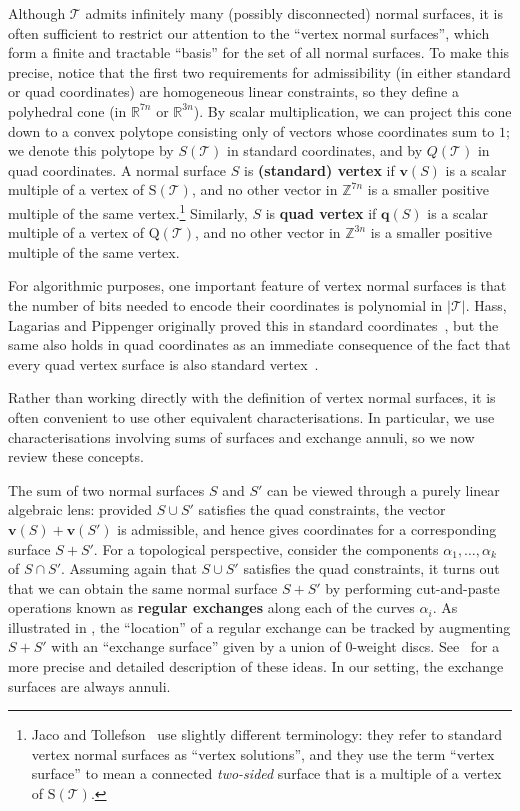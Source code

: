 \documentclass[10pt,a4paper]{amsart}
\newcommand{\tri}{\mathcal{T}}
\begin{document}
Although $\tri$ admits infinitely many (possibly disconnected) normal surfaces, it is often sufficient to restrict our attention to
the ``vertex normal surfaces'', which form a finite and tractable ``basis'' for the set of all normal surfaces.
To make this precise, notice that the first two requirements for admissibility (in either standard or quad coordinates) are homogeneous linear constraints,
so they define a polyhedral cone (in $\mathbb{R}^{7n}$ or $\mathbb{R}^{3n}$).
By scalar multiplication, we can project this cone down to a convex polytope consisting only of vectors whose coordinates sum to $1$;
we denote this polytope by $S(\tri)$ in standard coordinates, and by $Q(\tri)$ in quad coordinates.
A normal surface $S$ is \textbf{(standard) vertex} if $\mathbf{v}(S)$ is a scalar multiple of a vertex of $\mathrm{S}(\tri)$,
and no other vector in $\mathbb{Z}^{7n}$ is a smaller positive multiple of the same vertex.\footnote{%
Jaco and Tollefson~\cite{jaco1995algorithms} use slightly different terminology:
they refer to standard vertex normal surfaces as ``vertex solutions'',
and they use the term ``vertex surface'' to mean a connected \emph{two-sided} surface that is a multiple of a vertex of $\mathrm{S}(\tri)$.}
Similarly, $S$ is \textbf{quad vertex} if $\mathbf{q}(S)$ is a scalar multiple of a vertex of $\mathrm{Q}(\tri)$,
and no other vector in $\mathbb{Z}^{3n}$ is a smaller positive multiple of the same vertex.

For algorithmic purposes, one important feature of vertex normal surfaces is that the number of bits needed to encode their coordinates is polynomial in $|\tri|$.
Hass, Lagarias and Pippenger originally proved this in standard coordinates~\cite[Lemma~6.1]{hass1999computational},
but the same also holds in quad coordinates as an immediate consequence of the fact that every quad vertex surface is also standard vertex~\cite[Lemma 4.5]{Burton09Converting}.

Rather than working directly with the definition of vertex normal surfaces, it is often convenient to use other equivalent characterisations.
In particular, we use characterisations involving sums of surfaces and exchange annuli, so we now review these concepts.

The sum of two normal surfaces $S$ and $S'$ can be viewed through a purely linear algebraic lens:
provided $S\cup S'$ satisfies the quad constraints, the vector $\mathbf{v}(S)+\mathbf{v}(S')$
is admissible, and hence gives coordinates for a corresponding surface $S+S'$.
For a topological perspective, consider the components $\alpha_1, \ldots, \alpha_k$ of $S\cap S'$.
Assuming again that $S\cup S'$ satisfies the quad constraints, it turns out that we can obtain the same normal surface $S+S'$ by
performing cut-and-paste operations known as \textbf{regular exchanges} along each of the curves $\alpha_i$.
As illustrated in , the ``location'' of a regular exchange can be tracked by augmenting
$S+S'$ with an ``exchange surface'' given by a union of $0$-weight discs.
See~\cite[Section~2]{jaco1995algorithms} for a more precise and detailed description of these ideas.
In our setting, the exchange surfaces are always annuli.
\end{document}
